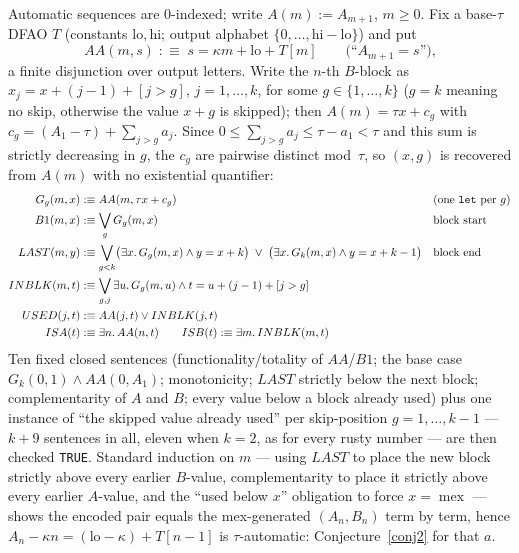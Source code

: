 \documentclass[10pt,reqno]{amsart}
\theoremstyle{plain}
\theoremstyle{definition}
\theoremstyle{remark}
\numberwithin{theorem}{section}
\DeclareMathOperator{\mex}{mex}
\begin{document}
Automatic sequences are $0$-indexed; write $A(m):=A_{m+1}$, $m\ge0$. Fix a base-$\tau$ DFAO $T$
(constants $\mathrm{lo},\mathrm{hi}$; output alphabet $\{0,\dots,\mathrm{hi}-\mathrm{lo}\}$) and
put
\[
  AA(m,s) \;:\equiv\; s=\kappa m+\mathrm{lo}+T[m] \qquad \text{(``}A_{m+1}=s\text{''),}
\]
a finite disjunction over output letters. Write the $n$-th $B$-block as
$x_j=x+(j-1)+[j>g]$, $j=1,\dots,k$, for some $g\in\{1,\dots,k\}$ ($g=k$ meaning no skip,
otherwise the value $x+g$ is skipped); then $A(m)=\tau x+c_g$ with
$c_g=(A_1-\tau)+\sum_{j>g}a_j$. Since $0\le\sum_{j>g}a_j\le\tau-a_1<\tau$ and this sum is
strictly decreasing in $g$, the $c_g$ are pairwise distinct mod~$\tau$, so $(x,g)$ is recovered
from $A(m)$ with no existential quantifier:
\begin{align*}
  G_g(m,x) &:\equiv AA(m,\tau x+c_g) && \text{(one \texttt{let} per } g\text{)}\\
  B1(m,x)  &:\equiv \bigvee_g G_g(m,x) && \text{block start}\\
  LAST(m,y) &:\equiv \bigvee_{g<k}\bigl(\exists x.\,G_g(m,x)\wedge y=x+k\bigr)
              \;\vee\;\bigl(\exists x.\,G_k(m,x)\wedge y=x+k-1\bigr) && \text{block end}\\
  INBLK(m,t) &:\equiv \bigvee_{g,j}\exists u.\,G_g(m,u)\wedge t=u+(j-1)+[j>g]\\
  USED(j,t) &:\equiv AA(j,t)\vee INBLK(j,t)\\
  ISA(t) &:\equiv\exists n.\,AA(n,t) \qquad ISB(t):\equiv\exists m.\,INBLK(m,t)
\end{align*}
Ten fixed closed sentences (functionality/totality of $AA$/$B1$; the base case $G_k(0,1)\wedge
AA(0,A_1)$; monotonicity; $LAST$ strictly below the next block; complementarity of $A$ and $B$;
every value below a block already used) plus one instance of ``the skipped value already used''
per skip-position $g=1,\dots,k-1$ --- $k+9$ sentences in all, eleven when $k=2$, as for every
rusty number --- are then checked \texttt{TRUE}. Standard induction on $m$ --- using $LAST$ to place the new block strictly above
every earlier $B$-value, complementarity to place it strictly above every earlier $A$-value, and
the ``used below $x$'' obligation to force $x=\mex$ --- shows the encoded pair equals the
mex-generated $(A_n,B_n)$ term by term, hence $A_n-\kappa n=(\mathrm{lo}-\kappa)+T[n-1]$ is
$\tau$-automatic: Conjecture~\ref{conj2} for that $a$.
\end{document}
